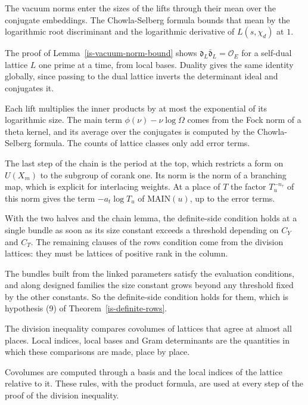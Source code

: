 The vacuum norms enter the sizes of the lifts through their mean over the conjugate embeddings. The
Chowla-Selberg formula bounds that mean by the logarithmic root discriminant and the logarithmic
derivative of $L(s,\chi_d)$ at $1$.

The proof of Lemma~\ref{is-vacuum-norm-bound} shows $\mathfrak d_L\bar{\mathfrak d}_L=\mathcal O_E$
for a self-dual lattice $L$ one prime at a time, from local bases. Duality gives the same identity
globally, since passing to the dual lattice inverts the determinant ideal and conjugates it.

Each lift multiplies the inner products by at most the exponential of its logarithmic size. The
main term $\phi(\nu)-\nu\log\Omega$ comes from the Fock norm of a theta kernel, and its average over
the conjugates is computed by the Chowla-Selberg formula. The counts of lattice classes only add
error terms.

The last step of the chain is the period at the top, which restricts a form on $U(X_m)$ to the
subgroup of corank one. Its norm is the norm of a branching map, which is explicit for interlacing
weights. At a place of $T$ the factor $T_u^{-n_\tau}$ of this norm gives the term $-a_t\log T_u$ of
$\mathrm{MAIN}(u)$, up to the error terms.

With the two halves and the chain lemma, the definite-side condition holds at a single bundle as
soon as its size constant exceeds a threshold depending on $C_Y$ and $C_T$. The remaining clauses
of the rows condition come from the division lattices: they must be lattices of positive rank in
the column.

The bundles built from the linked parameters satisfy the evaluation conditions, and along designed
families the size constant grows beyond any threshold fixed by the other constants. So the
definite-side condition holds for them, which is hypothesis (9) of Theorem~\ref{is-definite-rows}.

The division inequality compares covolumes of lattices that agree at almost all places. Local
indices, local bases and Gram determinants are the quantities in which these comparisons are made,
place by place.

Covolumes are computed through a basis and the local indices of the lattice relative to it. These
rules, with the product formula, are used at every step of the proof of the division inequality.

